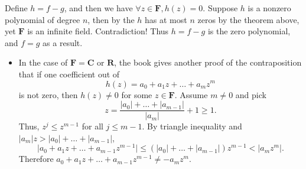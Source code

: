 \documentclass[11pt]{article}
\newcommand{\R}{\mathbf{R}}
\newcommand{\C}{\mathbf{C}}
\newcommand{\F}{\mathbf{F}}
\newcommand{\abs}[1]{\lvert #1 \rvert}
\begin{document}
\begin{itemize}
    Define $h = f-g$, and then we have $\forall z\in\F, h(z) = 0$. Suppose $h$ is a nonzero polynomial of degree $n$, then by the $h$ has at most $n$ zeros by the theorem above, yet $\F$ is an infinite field. Contradiction! Thus $h = f-g$ is the zero polynomial, and $f = g$ as a result.
    
    \begin{itemize}
        \item In the case of $\F = \C$ or $\R$, the book gives another proof of the contraposition that if one coefficient out of $$h(z) = a_0+a_1z+\dots+a_mz^m$$ is not zero, then $h(z) \not= 0$ for some $z \in \F$. Assume $m \not= 0$ and pick $$z = \frac{\abs{a_0} + \dots + \abs{a_{m-1}}}{\abs{a_m}}+1 \geq 1.$$ Thus, $z^j \leq z^{m-1}$ for all $j \leq m-1$. By triangle inequality and $\abs{a_m}z > \abs{a_0} + \dots + \abs{a_{m-1}}$, \[\abs{a_0+a_1z+\dots+a_{m-1}z^{m-1}} \leq (\abs{a_0}+\dots+\abs{a_{m-1}})z^{m-1} < \abs{a_m z^m}.\] Therefore $a_0+a_1z+\dots+a_{m-1}z^{m-1} \not= -a_m z^m$.
    \end{itemize}
    

\end{itemize}
\end{document}
